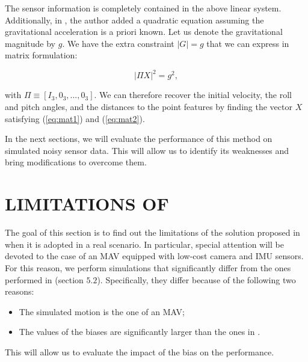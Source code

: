 \documentclass[letterpaper, 10 pt, journal, twoside]{IEEEtran}  %
\begin{document}
The sensor information is completely contained in the above linear system. Additionally, in \cite{Martinelli2014}, the author added a quadratic equation assuming the gravitational acceleration is a priori known.
Let us denote the gravitational magnitude by $g$.
We have the extra constraint $|G| = g$ that we can express in matrix formulation:

\begin{equation}
\label{eq:mat2}
| \Pi X | ^2 = g^2,
\end{equation}

\noindent with $\Pi \equiv [I_3, 0_3, ..., 0_3]$. We can therefore recover the initial velocity, the roll and pitch angles, and the distances to the point features
by finding the vector $X$ satisfying (\ref{eq:mat1}) and (\ref{eq:mat2}).

In the next sections, we will evaluate the performance of this method on simulated noisy sensor data.
This will allow us to identify its weaknesses and bring modifications to overcome them.





\section{LIMITATIONS OF \cite{Martinelli2014}}\label{SectionBottlenecks}

The goal of this section is to find out the limitations of the solution proposed in \cite{Martinelli2014} when it is adopted in a real scenario. In particular, special attention will be devoted to the case of an MAV equipped with low-cost camera and IMU sensors. For this reason, we perform simulations that significantly differ from the ones performed in \cite{Martinelli2014} (section $5.2$). Specifically, they differ because of the following two reasons:
\begin{itemize}
\item The simulated motion is the one of an MAV;
\item The values of the biases are significantly larger than the ones in \cite{Martinelli2014}.
\end{itemize}
This will allow us to evaluate the impact of the bias on the performance.
\end{document}
